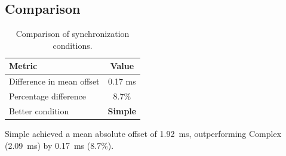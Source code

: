 \subsection*{Comparison}

\begin{table}[h!]
\centering
\begin{tabular}{|l|c|}
\hline
Metric & Value \\
\hline
Difference in mean offset & 0.17 ms \\
Percentage difference & 8.7\% \\
Better condition & \textbf{Simple} \\
\hline
\end{tabular}
\caption{Comparison of synchronization conditions.}
\label{tab:sync_comparison}
\end{table}

Simple achieved a mean absolute offset of 1.92~ms, outperforming Complex (2.09~ms) by 0.17~ms (8.7\%).
